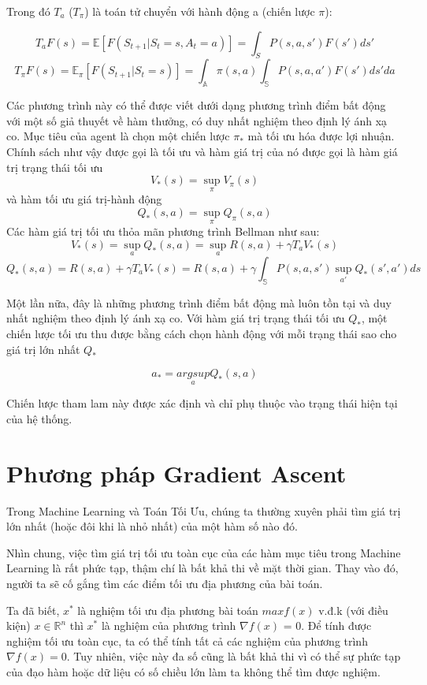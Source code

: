 \documentclass[14pt]{extreport}
\begin{document}
 Trong đó $T_a$ ($T_\pi$) là toán tử chuyển với hành động a (chiến lược $\pi$):
 
$$
 T_a F(s)=\mathbb{E}\left[F(S_{t+1} |S_t = s,A_t =a)\right]= \int _{S} P(s,a,s') F(s') ds'
 $$
$$ T_ \pi F(s)= \mathbb{E}_ \pi [F(S_{t+1} |S_t = s)]= \int _{\mathbb{A} } \pi (s,a) \int _{\mathbb{S}} P(s,a,a') F(s') ds' da
 $$
 
 Các phương trình này có thể được viết dưới dạng phương trình điểm bất động với một số giả thuyết về hàm thưởng, có duy nhất nghiệm theo định lý ánh xạ co. Mục tiêu của agent là chọn một chiến lược $\pi_{*}$ mà tối ưu hóa được lợi nhuận. Chính sách như vậy được gọi là tối ưu và hàm giá trị của nó được gọi là hàm giá trị trạng thái tối ưu 
$$
 V_{*} (s)= \sup_{\pi} V_\pi (s)
 $$ 
 và hàm tối ưu giá trị-hành động  
 $$Q_{*}(s,a)= \sup _\pi Q_\pi (s,a)$$ 
 Các hàm giá trị tối ưu thỏa mãn phương trình Bellman như sau:
  $$V_* (s)= \sup _a Q_* (s,a)=\sup _a {R(s,a)+\gamma T_a V_* (s)}$$ 
 $$Q_*(s,a)=R(s,a)+\gamma T_a V_* (s)=R(s,a)+\gamma \int _{\mathbb{S}}P(s,a,s') \sup _{a'} Q_*(s',a')ds$$

Một lần nữa, đây là những phương trình điểm bất động mà luôn tồn tại và duy nhất nghiệm theo định lý ánh xạ co. Với hàm giá trị trạng thái tối ưu $Q_*$, một chiến lược tối ưu thu được bằng cách chọn hành động với mỗi trạng thái sao cho giá trị lớn nhất $Q_*$


$$a_* = \underset{a}{argsup} Q_*(s,a)$$

Chiến lược tham lam này được xác định và chỉ phụ thuộc vào trạng thái hiện tại của hệ thống.

\section{Phương pháp Gradient Ascent}
Trong Machine Learning và Toán Tối Ưu, chúng ta thường xuyên phải tìm giá trị lớn nhất (hoặc đôi khi là nhỏ nhất) của một hàm số nào đó.

Nhìn chung, việc tìm giá trị tối ưu toàn cục của các hàm mục tiêu trong Machine Learning là rất phức tạp, thậm chí là bất khả thi về mặt thời gian. Thay vào đó, người ta sẽ cố gắng tìm các điểm tối ưu địa phương của bài toán.

Ta đã biết, $x^*$ là nghiệm tối ưu địa phương bài toán $max f(x)$ v.đ.k (với điều kiện) $x\in\mathbb{R}^n$ thì $x^*$ là nghiệm của phương trình $\nabla f(x)$ = 0. Để tính được nghiệm tối ưu toàn cục, ta có thể tính tất cả các nghiệm của phương trình $\nabla f(x) = 0$. Tuy nhiên, việc này đa số cũng là bất khả thi vì có thể sự phức tạp của đạo hàm hoặc dữ liệu có số chiều lớn làm ta không thể tìm được nghiệm.
\end{document}
